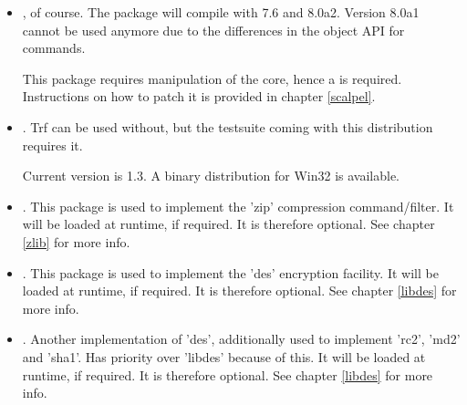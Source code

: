\documentclass {report}
\begin{document}
\begin{itemize}
\item	\strong {\tcl}, of course. The package will compile with 7.6
	and 8.0a2. Version 8.0a1 cannot be used anymore due to the
	differences in the object API for commands.

	This package requires manipulation of the core, hence a
	 is required. Instructions on how
	to patch it is provided in chapter \ref {scalpel}.

\item	{}. Trf can be used without, but the
	testsuite coming with this distribution requires it.

	Current version is 1.3. A binary distribution for Win32 is
	available.


	
\item	\strong {\zlib}. This package is used to implement the 'zip'
	compression command/filter. It will be loaded at runtime, if
	required. It is therefore optional. See chapter \ref {zlib} for
	more info.

\item	{}. This package is used to implement the 'des'
	encryption facility. It will be loaded at runtime, if
	required. It is therefore optional. See chapter \ref {libdes}
	for more info.

\item	\strong {\SSLeay}. Another implementation of 'des',
	additionally used to implement 'rc2', 'md2' and 'sha1'. Has
	priority over 'libdes' because of this. It will be loaded at
	runtime, if required. It is therefore optional. See chapter
	\ref {libdes} for more info.
\end{itemize}
\end{document}
